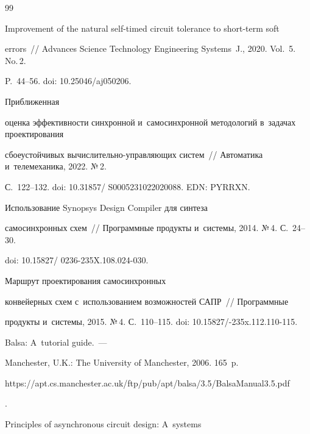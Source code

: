 {{\begin{thebibliography}{99}

 Improvement of the natural self-timed circuit tolerance to short-term soft 

errors~/\!\!/ Advances Science Technology Engineering Systems~J., 2020. Vol.~5. No.\,2.  

P.~44--56. doi: 10.25046\!/\!aj050206.




    Приближенная 

оценка эффективности синхронной и~самосинхронной методологий в~задачах проектирования 

сбоеустойчивых вы\-чис\-ли\-тель\-но-управ\-ля\-ющих сис\-тем~/\!\!/ Автоматика и~телемеханика, 2022. №\,2.  

С.~122--132. doi: 10.31857\!/ S0005231022020088. EDN: PYRRXN. 




 Использование Synopsys Design Compiler для синтеза 

самосинхронных схем~/\!\!/ Программные продукты и~системы, 2014. №\,4. С.~24--30. 

doi: 10.15827\!/ 0236-235X.108.024-030.


 Маршрут проектирования самосинхронных 

конвейерных схем с~использованием возможностей САПР~/\!\!/ Программные 

продукты и~системы, 2015. №\,4. С.~110--115. doi: 10.15827\!/-235x.112.110-115.


 Balsa: A~tutorial guide.~--- 

Manchester, U.K.: The University of Manchester, 2006. 165~p.  {\sf 

https://apt.cs.\linebreak manchester.ac.uk/ftp/pub/apt/balsa/3.5/BalsaManual3.5.pdf}.


 Principles of asynchronous circuit design: A~systems 


\end{thebibliography}}}
